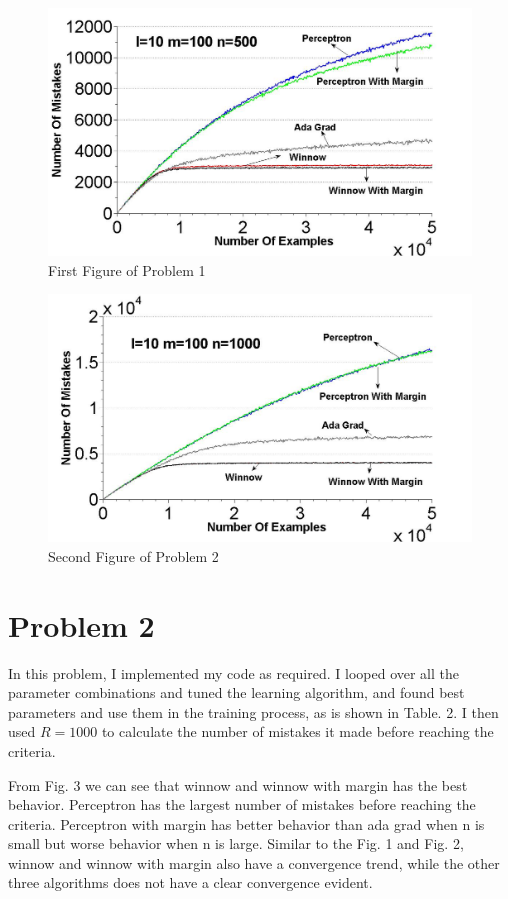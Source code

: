 \begin{figure}[h!]
	\centering
	\includegraphics[width=1\textwidth]{Problem1Figure1}
	\caption{First Figure of Problem 1}
\end{figure}

\begin{figure}[h!]
	\centering
	\includegraphics[width=1\textwidth]{Problem1Figure2}
	\caption{Second Figure of Problem 2}
\end{figure}

\section{Problem 2}
In this problem, I implemented my code as required. I looped over all the parameter combinations and tuned the learning algorithm, and found best parameters and use them in the training process, as is shown in Table. 2. I then used $R=1000$ to calculate the number of mistakes it made before reaching the criteria. 

\noindent From Fig. 3 we can see that winnow and winnow with margin has the best behavior. Perceptron has the largest number of mistakes before reaching the criteria. Perceptron with margin has better behavior than ada grad when n is small but worse behavior when n is large. Similar to the Fig. 1 and Fig. 2, winnow and winnow with margin also have a convergence trend, while the other three algorithms does not have a clear convergence evident. 

